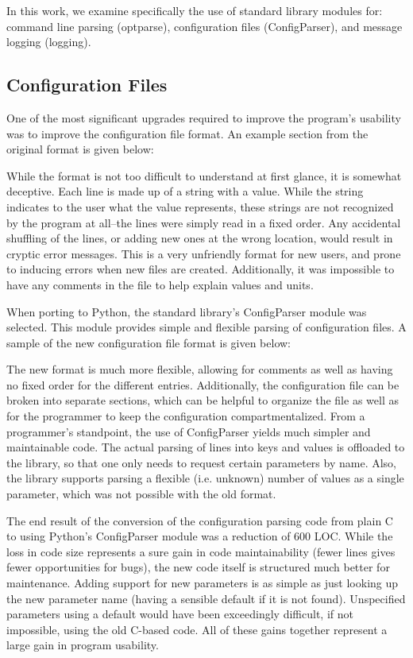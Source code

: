 \documentclass[twocolumn]{article}
\begin{document}
In this work, we examine specifically the use of standard library modules for:
command line parsing (optparse), configuration files (ConfigParser), and message logging (logging).

\subsection{Configuration Files}
One of the most significant upgrades required to improve the program's usability
was to improve the configuration file format. An example section from the original
format is given below:

  

While the format is not too difficult to understand at first glance, it is
somewhat deceptive. Each line is made up of a string with a value. While the
string indicates to the user what the value represents, these strings are not
recognized by the program at all--the lines were simply read in a fixed order.
Any accidental shuffling of the lines, or adding new ones at the wrong location,
would result in cryptic error messages. This is a very unfriendly format for new
users, and prone to inducing errors when new files are created. Additionally, it
was impossible to have any comments in the file to help explain values and
units.

When porting to Python, the standard library's ConfigParser module was selected.
\cite{configparser} This module provides simple and flexible parsing of
configuration files. A sample of the new configuration file format is given
below:



The new format is much more flexible, allowing for comments as well as having
no fixed order for the different entries. Additionally, the configuration file
can be broken into separate sections, which can be helpful to organize the file
as well as for the programmer to keep the configuration compartmentalized. From
a programmer's standpoint, the use of ConfigParser yields much simpler and 
maintainable code. The actual parsing of lines into keys and values is offloaded to
the library, so that one only needs to request certain parameters by name.
Also, the library supports parsing a flexible (i.e. unknown) number of values
as a single parameter, which was not possible with the old format.

The end result of the conversion of the configuration parsing code from plain C
to using Python's ConfigParser module was a reduction of 600 LOC. While the loss
in code size represents a sure gain in code maintainability (fewer lines gives
fewer opportunities for bugs), the new code itself is structured much better
for maintenance. Adding support for new parameters is as simple as just looking
up the new parameter name (having a sensible default if it is not found). Unspecified
parameters using a default would have been exceedingly difficult, if not impossible,
using the old C-based code. All of these gains together represent a large gain
in program usability.
\end{document}

